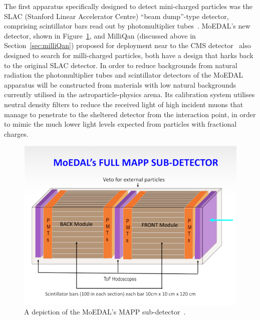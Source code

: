 The first apparatus specifically designed to detect mini-charged particles was the SLAC (Stanford Linear Accelerator Centre) ``beam dump''-type detector, comprising scintillator bars read out by photomultiplier tubes~\cite{Prinz:1998ua}. MoEDAL's new detector, shown in Figure~\ref{fg:mapp}, and MilliQan (discussed above in Section~\ref{sec:milliQan}) proposed for deployment near to the CMS detector~\cite{Haas:2014dda} also designed to search for milli-charged particles, both have a design that harks back to the original SLAC detector. In order to reduce backgrounds from natural radiation the photomultiplier tubes and scintillator detectors of the MoEDAL apparatus will be constructed from materials with low natural backgrounds currently utilised in the astroparticle-physics arena. Its calibration system utilises neutral density filters to reduce the received light of high incident muons that manage to penetrate to the sheltered detector from the interaction point, in order to mimic the much lower light levels expected from particles with fractional charges.

\begin{figure}[ht]
   \centering
   \includegraphics[width=0.95\linewidth]{plots/MAPP-NEW.pdf}
   \caption{A depiction of the MoEDAL's MAPP sub-detector~\cite{mapp-mall-pinfold}.}
   \label{fg:mapp}
\end{figure}


